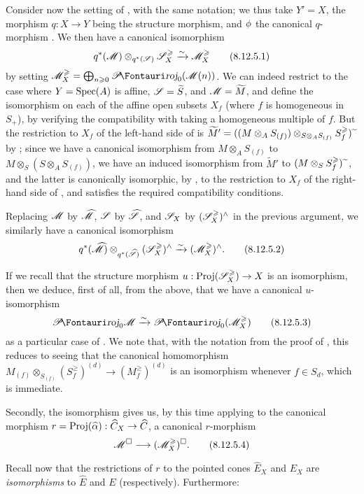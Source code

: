 \begin{env}[8.12.5]
\label{II.8.12.5}
Consider now the setting of , with the same notation;
we thus take $Y'=X$, the morphism $q:X\to Y$ being the structure morphism, and $\phi$ the canonical $q$-morphism .
We then have a canonical isomorphism
\[
\label{II.8.12.5.1}
    q^*(\mathscr{M})\otimes_{q^*(\mathscr{S})}\mathscr{S}_X^\geqslant \xrightarrow{\sim} \mathscr{M}_X^\geqslant
\tag{8.12.5.1}
\]
by setting $\sh{M}_X^\geq=\bigoplus_{n\geq0}\shProj_0(\sh{M}(n))$.
We can indeed restrict to the case where $Y=\operatorname{Spec}(A)$ is affine, $\mathscr{S}=\widetilde{S}$, and $\mathscr{M}=\widetilde{M}$, and define the isomorphism  on each of the affine open subsets $X_f$ (where $f$ is homogeneous in $S_+$), by verifying the compatibility with taking a homogeneous multiple of $f$.
But the restriction to $X_f$ of the left-hand side of  is $\widetilde{M}'=((M\otimes_A S_{(f)})\otimes_{S\otimes_A S_{(f)}}S_f^\geqslant){\,\widetilde{\,}\,}$ by ;
since we have a canonical isomorphism from $M\otimes_A S_{(f)}$ to $M\otimes_S(S\otimes_A S_{(f)})$, we have an induced isomorphism from $\widetilde{M}'$ to $(M\otimes_S S_f^\geqslant){\,\widetilde{\,}\,}$, and the latter is canonically isomorphic, by , to the restriction to $X_f$ of the right-hand side of , and satisfies the required compatibility conditions.

Replacing $\mathscr{M}$ by $\widehat{\mathscr{M}}$, $\mathscr{S}$ by $\widehat{\mathscr{S}}$, and $\mathscr{S}_X$ by $(\mathscr{S}_X^\geqslant)^\wedge$ in the previous argument, we similarly have a canonical isomorphism
\[
\label{II.8.12.5.2}
    q^*(\widehat{\mathscr{M}})\otimes_{q^*(\widehat{\mathscr{S}})}(\mathscr{S}_X^\geqslant)^\wedge \xrightarrow{\sim} (\mathscr{M}_X^\geqslant)^\wedge.
\tag{8.12.5.2}
\]

If we recall  that the structure morphism $u:\Proj(\sh{S}_X^\geq)\to X$ is an isomorphism, then we deduce, first of all, from the above, that we have a canonical $u$-isomorphism
\[
\label{II.8.12.5.3}
    \shProj_0\sh{M} \simto \shProj_0(\sh{M}_X^\geq)
\tag{8.12.5.3}
\]
as a particular case of .
We note that, with the notation from the proof of , this reduces to seeing that the canonical homomorphism $M_{(f)}\otimes_{S_{(f)}}(S_f^\geq)^{(d)}\to(M_f^\geq)^{(d)}$ is an isomorphism whenever $f\in S_d$, which is immediate.

Secondly, the isomorphism  gives us, by this time applying  to the canonical morphism $r=\Proj(\widehat{\alpha}):\widehat{C}_X\to\widehat{C}$, a canonical $r$-morphism
\[
\label{II.8.12.5.4}
    \sh{M}^\square \to (\sh{M}_X^\geq)^\square.
\tag{8.12.5.4}
\]

Recall now  that the restrictions of $r$ to the pointed cones $\widehat{E}_X$ and $E_X$ are \emph{isomorphisms} to $\widehat{E}$ and $E$ (respectively).
Furthermore:
\end{env}

